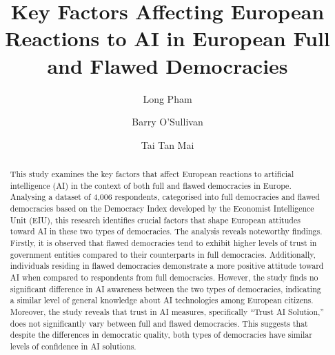 \documentclass[
]{ceurart}
\begin{document}


\title{Key Factors Affecting European Reactions to AI in European Full and Flawed Democracies}


\author[1]{Long Pham}
\address[1]{Insight SFI Research Centre for Data Analytics, School of Computer Science, University College Cork, Ireland}

\author[1]{Barry O'Sullivan}
\address[2]{School of Computing, Dublin City University}

\author[2]{Tai Tan Mai}


\begin{abstract}
This study examines the key factors that affect European reactions to artificial intelligence (AI) in the context of both full and flawed democracies in Europe. Analysing a dataset of 4,006 respondents, categorised into full democracies and flawed democracies based on the Democracy Index developed by the Economist Intelligence Unit (EIU), this research identifies crucial factors that shape European attitudes toward AI in these two types of democracies. The analysis reveals noteworthy findings.
Firstly, it is observed that flawed democracies tend to exhibit higher levels of trust in government entities compared to their counterparts in full democracies. Additionally, individuals residing in flawed democracies demonstrate a more positive attitude toward AI when compared to respondents from full democracies. However, the study finds no significant difference in AI awareness between the two types of democracies, indicating a similar level of general knowledge about AI technologies among European citizens. Moreover, the study reveals that trust in AI measures, specifically ``Trust AI Solution,'' does not significantly vary between full and flawed democracies. This suggests that despite the differences in democratic quality, both types of democracies have similar levels of confidence in AI solutions.

\end{abstract}
\end{document}
